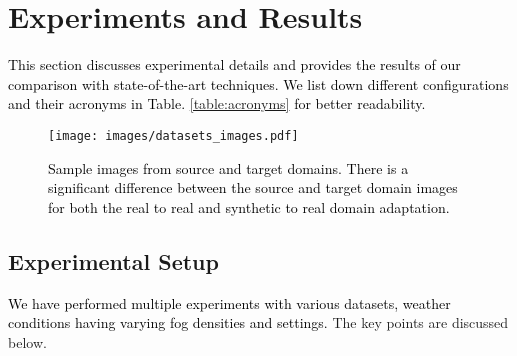\documentclass[final,5p,times,twocolumn]{elsarticle}
\begin{document}
\section{Experiments and Results}
\label{sec:exp}
\textcolor{black}{This section discusses experimental details and provides the results of our comparison with state-of-the-art techniques.
We list down different configurations and their acronyms in Table. \ref{table:acronyms} for better readability. }
\begin{table}[H]
\footnotesize
\centering
\caption{Different configurations and their acronyms.}
\label{table:acronyms}
\end{table}


\begin{figure*}[t]
 	\centering
 	\texttt{[image: images/datasets\_images.pdf]}
 	\scriptsize
 	\caption{\textcolor{black}{Sample images from source and target domains. There is a significant difference between the source and target domain images for both the real to real and synthetic to real domain adaptation. }}
 	\label{img:datasets-images}
\end{figure*}

\subsection{Experimental Setup}
\textcolor{black}{
We have performed multiple experiments with various datasets, weather conditions having varying fog densities and settings.}
The key points are discussed below.
\end{document}

